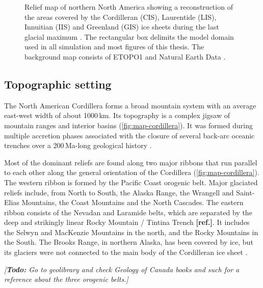 \documentclass{article}
\newcommand{\todo}[1]{\emph{[\textbf{Todo:} #1]}}
\newcommand{\mref}[0]{\textbf{[ref.]}}
\newcommand{\chem}[1]{\ensuremath{\mathrm{#1}}}
\begin{document}
\begin{figure}
  \centering
  \caption{Relief map of northern North America showing a reconstruction of the
           areas covered by the Cordilleran (CIS), Laurentide (LIS), Innuitian
           (IIS) and Greenland (GIS) ice sheets during the last glacial maximum
           \citep[21.4 to 16.8\,cal\,\chem{^{14}C}\,kyr\,BP,][]{Dyke.2004}.
           The rectangular box delimits the model domain used in all simulation
           and most figures of this thesis. The background
           map consists of ETOPO1 \citep{Amante.Eakins.2009} and Natural Earth
           Data \citep{Patterson.Kelso.2014}.}
  \label{fig:map-northamerica}
\end{figure}

\subsection{Topographic setting}

The North American Cordillera forms a broad mountain system with an
average east-west width of about 1000\,km. Its topography is a complex
jigsaw of mountain ranges and interior basins (\cref{fig:map-cordillera}).
It was formed during multiple accretion phases associated with the closure of
several back-arc oceanic trenches over a 200\,Ma-long geological history
\citep{Sigloch.Mihalynuk.2013}.

Most of the dominant reliefs are found along two major ribbons that run
parallel to each other along the general orientation of the Cordillera
(\cref{fig:map-cordillera}). The western ribbon is formed by the Pacific Coast
orogenic belt. Major glaciated reliefs include,
from North to South, the Alaska Range, the Wrangell and Saint-Elias Mountains,
the Coast Mountains and the North Cascades. The eastern ribbon consists of the
Nevadan and Laramide belts, which are separated by the deep and strikingly
linear Rocky Mountain / Tintina Trench \mref. It includes the Selwyn and
MacKenzie Mountains in the north, and the Rocky Mountains in the South. The
Brooks Range, in northern Alaska, has been covered by ice, but its glaciers
were not connected to the main body of the Cordilleran ice sheet
\citep{Kaufman.Manley.2004}.

\todo{Go to geolibrary and check \emph{Geology of Canada} books and such for a
      reference about the three orogenic belts.}
\end{document}
